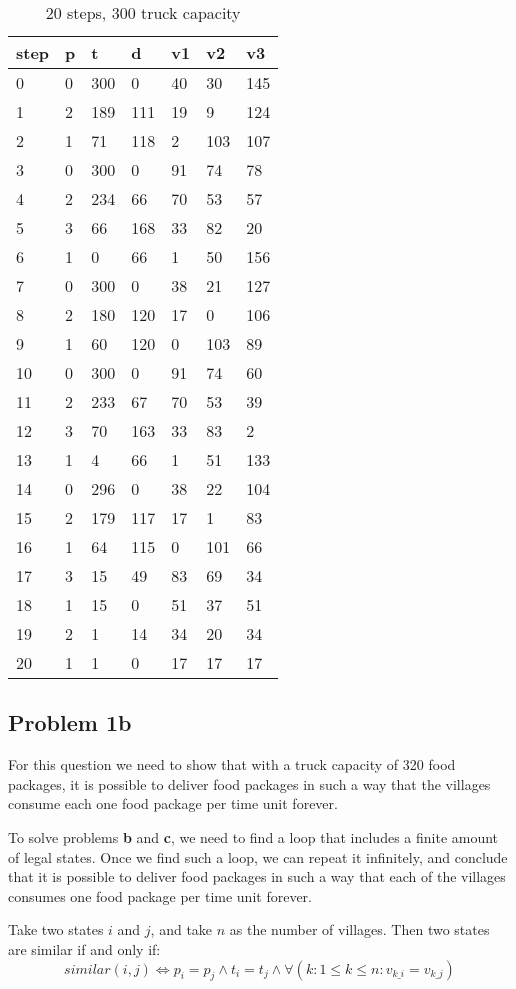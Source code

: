 \documentclass[a4paper]{article}
\begin{document}
	\begin{longtable}[c]{@{}|l|l|l|l|l|l|l|@{}}
		\caption{20 steps, 300 truck capacity}\\
		\toprule
		step & p & t & d & v1 & v2 & v3\tabularnewline
		\midrule
		\endhead
		0 & 0 & 300 & 0 & 40 & 30 & 145\tabularnewline
		1 & 2 & 189 & 111 & 19 & 9 & 124\tabularnewline
		2 & 1 & 71 & 118 & 2 & 103 & 107\tabularnewline
		3 & 0 & 300 & 0 & 91 & 74 & 78\tabularnewline
		4 & 2 & 234 & 66 & 70 & 53 & 57\tabularnewline
		5 & 3 & 66 & 168 & 33 & 82 & 20\tabularnewline
		6 & 1 & 0 & 66 & 1 & 50 & 156\tabularnewline
		7 & 0 & 300 & 0 & 38 & 21 & 127\tabularnewline
		8 & 2 & 180 & 120 & 17 & 0 & 106\tabularnewline
		9 & 1 & 60 & 120 & 0 & 103 & 89\tabularnewline
		10 & 0 & 300 & 0 & 91 & 74 & 60\tabularnewline
		11 & 2 & 233 & 67 & 70 & 53 & 39\tabularnewline
		12 & 3 & 70 & 163 & 33 & 83 & 2\tabularnewline
		13 & 1 & 4 & 66 & 1 & 51 & 133\tabularnewline
		14 & 0 & 296 & 0 & 38 & 22 & 104\tabularnewline
		15 & 2 & 179 & 117 & 17 & 1 & 83\tabularnewline
		16 & 1 & 64 & 115 & 0 & 101 & 66\tabularnewline
		17 & 3 & 15 & 49 & 83 & 69 & 34\tabularnewline
		18 & 1 & 15 & 0 & 51 & 37 & 51\tabularnewline
		19 & 2 & 1 & 14 & 34 & 20 & 34\tabularnewline
		20 & 1 & 1 & 0 & 17 & 17 & 17\tabularnewline
		\bottomrule
	\end{longtable}
		
	\subsection*{Problem 1b}
	For this question we need to show that with a truck capacity of 320 food packages, it is possible to deliver food packages in such a way that the villages consume each one food package per time unit forever.
	
	To solve problems \textbf{b} and \textbf{c}, we need to find a loop that includes a finite amount of legal states. Once we find such a loop, we can repeat it infinitely, and conclude that it is possible to deliver food packages in such a way that each of the villages consumes one food package per time unit forever.
	
	Take two states $i$ and $j$, and take $n$ as the number of villages. Then two states are similar if and only if:
	$$similar(i, j) \Leftrightarrow p_i = p_j \wedge t_i = t_j \wedge \forall (k: 1 \leq k \leq n : v_{k\_i} = v_{k\_j})$$
	
\end{document}
